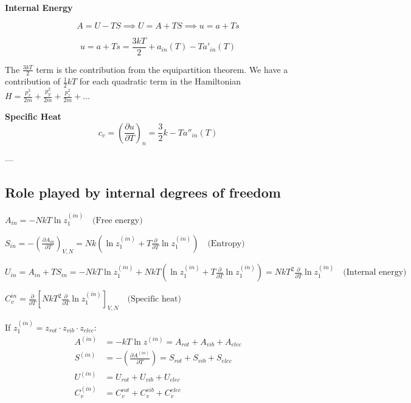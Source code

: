 \documentclass[12pt,a4paper]{report}
\newcommand{\esp}{\vspace{0.5cm}}
\begin{document}
	\esp
	
	\noindent \textbf{Internal Energy}
	
	\begin{equation}
		A = U - TS \implies U = A + TS \implies u = a + Ts
	\end{equation}
	
	\esp
	
	\begin{equation}
		u = a + Ts = \frac{3kT}{2} + a_{in}(T) - T a'_{in}(T)
	\end{equation}
	
	\esp
	
	The $\frac{3kT}{2}$ term is the contribution from the equipartition theorem. We have a contribution of $\frac{1}{2}kT$ for each quadratic term in the Hamiltonian $H = \frac{p_x^2}{2m} + \frac{p_y^2}{2m} + \frac{p_z^2}{2m} + \dots$
	
	\textbf{Specific Heat}
	\begin{equation}
		c_v = \left( \frac{\partial u}{\partial T} \right)_n = \frac{3}{2}k - T a''_{in}(T)
	\end{equation}
	
	\esp
	
	---
	
	\esp
	
	\subsection{Role played by internal degrees of freedom}
	
	\esp
	
	$A_{in} = -NkT \ln z_1^{(in)} \quad \text{(Free energy)}$
	
	\esp
	
	$S_{in} = -\left( \frac{\partial A_{in}}{\partial T} \right)_{V, N} = Nk \left( \ln z_1^{(in)} + T \frac{\partial}{\partial T} \ln z_1^{(in)} \right) \quad \text{(Entropy)}$
	
	\esp
	
	$U_{in} = A_{in} + TS_{in} = -NkT \ln z_1^{(in)} + NkT \left( \ln z_1^{(in)} + T \frac{\partial}{\partial T} \ln z_1^{(in)} \right) = NkT^2 \frac{\partial}{\partial T} \ln z_1^{(in)} \quad \text{(Internal energy)}$
	
	\esp
	
	$C_v^{in} = \frac{\partial}{\partial T} \left[ NkT^2 \frac{\partial}{\partial T} \ln z_1^{(in)} \right]_{V, N} \quad \text{(Specific heat)}$
	
	\esp
	
	If $z_1^{(in)} = z_{rot} \cdot z_{vib} \cdot z_{elec}$:
	\begin{align*}
		A^{(in)} &= -kT \ln z^{(in)} = A_{rot} + A_{vib} + A_{elec} \\
		S^{(in)} &= -\left( \frac{\partial A^{(in)}}{\partial T} \right) = S_{rot} + S_{vib} + S_{elec} \\
		U^{(in)} &= U_{rot} + U_{vib} + U_{elec} \\
		C_v^{(in)} &= C_v^{rot} + C_v^{vib} + C_v^{elec}
	\end{align*}
	
\end{document}
